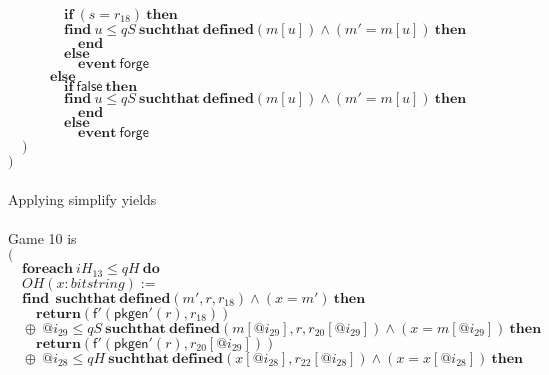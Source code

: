 \documentclass{article}
\newcommand{\kw}[1]{\mathbf{#1}}
\newcommand{\kwf}[1]{\mathsf{#1}}
\newcommand{\var}[1]{\mathit{#1}}
\newcommand{\kwt}[1]{\mathit{#1}}
\newcommand{\kwp}[1]{\mathit{#1}}
\begin{document}
\begin{tabbing}
$\quad \quad \quad \quad \kw{if}\ (\var{s}  =  \var{r}_{18})\ \kw{then}$\\
$\quad \quad \quad \quad \kw{find}\ \var{u} \leq \kwp{qS}\ \kw{suchthat}\ \kw{defined}(\var{m}[\var{u}])\wedge (\var{m'}  =  \var{m}[\var{u}])\ \kw{then}$\\
$\quad \quad \quad \quad \quad \kw{end}$\\
$\quad \quad \quad \quad \kw{else}$\\
$\quad \quad \quad \quad \quad \kw{event}\ \kwf{forge}$\\
$\quad \quad \quad \kw{else}$\\
$\quad \quad \quad \quad \kw{if}\ \kwf{false}\ \kw{then}$\\
$\quad \quad \quad \quad \kw{find}\ \var{u} \leq \kwp{qS}\ \kw{suchthat}\ \kw{defined}(\var{m}[\var{u}])\wedge (\var{m'}  =  \var{m}[\var{u}])\ \kw{then}$\\
$\quad \quad \quad \quad \quad \kw{end}$\\
$\quad \quad \quad \quad \kw{else}$\\
$\quad \quad \quad \quad \quad \kw{event}\ \kwf{forge}$\\
$\quad )$\\
$)$\\
$ $\\
\\
Applying simplify yields\\
\\
Game 10 is\\
$($\\
$\quad \kw{foreach}\ \var{iH}_{13} \leq \kwp{qH}\ \kw{do}$\\
$\quad OH(\var{x}: \kwt{bitstring}) :=$\\
$\quad \kw{find}\ \ \kw{suchthat}\ \kw{defined}(\var{m'}, \var{r}, \var{r}_{18})\wedge (\var{x}  =  \var{m'})\ \kw{then}$\\
$\quad \quad \kw{return}\kwf{}(\kwf{f'}(\kwf{pkgen'}(\var{r}), \var{r}_{18}))$\\
$\quad \oplus\ \var{@i}_{29} \leq \kwp{qS}\ \kw{suchthat}\ \kw{defined}(\var{m}[\var{@i}_{29}], \var{r}, \var{r}_{20}[\var{@i}_{29}])\wedge (\var{x}  =  \var{m}[\var{@i}_{29}])\ \kw{then}$\\
$\quad \quad \kw{return}\kwf{}(\kwf{f'}(\kwf{pkgen'}(\var{r}), \var{r}_{20}[\var{@i}_{29}]))$\\
$\quad \oplus\ \var{@i}_{28} \leq \kwp{qH}\ \kw{suchthat}\ \kw{defined}(\var{x}[\var{@i}_{28}], \var{r}_{22}[\var{@i}_{28}])\wedge (\var{x}  =  \var{x}[\var{@i}_{28}])\ \kw{then}$\\

\end{tabbing}
\end{document}
